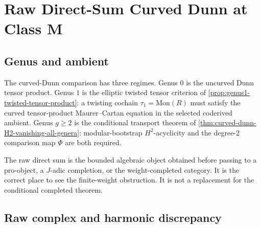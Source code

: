 
\chapter{Raw Direct-Sum Curved Dunn at Class M}
\label{ch:curved-dunn-raw-direct-sum-platonic}

\section*{Genus and ambient}

The curved-Dunn comparison has three regimes. Genus \(0\) is the
uncurved Dunn tensor product. Genus \(1\) is the elliptic twisted
tensor criterion of
\autoref{prop:genus1-twisted-tensor-product}: a twisting cochain
\(\tau_{1}=\mathrm{Mon}(R)\) must satisfy the curved tensor-product
Maurer--Cartan equation in the selected coderived ambient. Genus
\(g \ge 2\) is the conditional transport theorem of
\autoref{thm:curved-dunn-H2-vanishing-all-genera}: modular-bootstrap
\(H^{2}\)-acyclicity and the degree-\(2\) comparison map
\(\Phi\) are both required.

The raw direct sum is the bounded algebraic object obtained before
passing to a pro-object, a \(J\)-adic completion, or the
weight-completed category. It is the correct place to see the
finite-weight obstruction. It is not a replacement for the
conditional completed theorem.

\section{Raw complex and harmonic discrepancy}
\label{sec:setup-harmonic-discrepancy}

